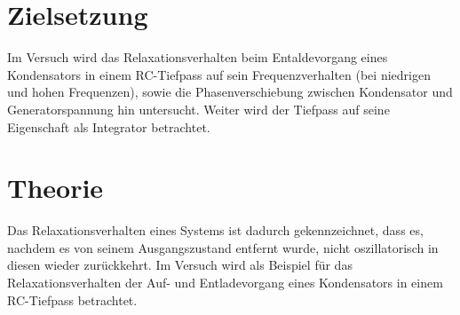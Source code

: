 \section{Zielsetzung}
Im Versuch wird das Relaxationsverhalten beim Entaldevorgang eines Kondensators
in einem RC-Tiefpass auf sein Frequenzverhalten (bei niedrigen und hohen Frequenzen),
sowie die Phasenverschiebung zwischen Kondensator und Generatorspannung hin untersucht.
Weiter wird der Tiefpass auf seine Eigenschaft als Integrator betrachtet.

\section{Theorie}
Das Relaxationsverhalten eines Systems ist dadurch gekennzeichnet, dass es, nachdem
es von seinem Ausgangszustand entfernt wurde, nicht oszillatorisch in diesen wieder
zurückkehrt.
Im Versuch wird als Beispiel für das Relaxationsverhalten der Auf- und Entladevorgang
eines Kondensators in einem RC-Tiefpass betrachtet.

